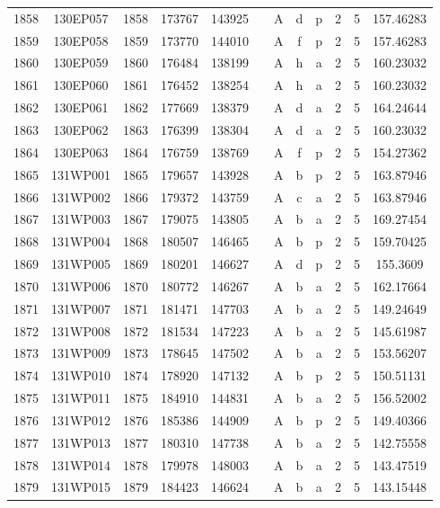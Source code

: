 \begin{tabular}{|*{12}{c|}}
1858 & 130EP057 & 1858 & 173767 & 143925 &  & A & d & p & 2 & 5 & 157.46283 \\ 
1859 & 130EP058 & 1859 & 173770 & 144010 &  & A & f & p & 2 & 5 & 157.46283 \\ 
1860 & 130EP059 & 1860 & 176484 & 138199 &  & A & h & a & 2 & 5 & 160.23032 \\ 
1861 & 130EP060 & 1861 & 176452 & 138254 &  & A & h & a & 2 & 5 & 160.23032 \\ 
1862 & 130EP061 & 1862 & 177669 & 138379 &  & A & d & a & 2 & 5 & 164.24644 \\ 
1863 & 130EP062 & 1863 & 176399 & 138304 &  & A & d & a & 2 & 5 & 160.23032 \\ 
1864 & 130EP063 & 1864 & 176759 & 138769 &  & A & f & p & 2 & 5 & 154.27362 \\ 
1865 & 131WP001 & 1865 & 179657 & 143928 &  & A & b & p & 2 & 5 & 163.87946 \\ 
1866 & 131WP002 & 1866 & 179372 & 143759 &  & A & c & a & 2 & 5 & 163.87946 \\ 
1867 & 131WP003 & 1867 & 179075 & 143805 &  & A & b & a & 2 & 5 & 169.27454 \\ 
1868 & 131WP004 & 1868 & 180507 & 146465 &  & A & b & p & 2 & 5 & 159.70425 \\ 
1869 & 131WP005 & 1869 & 180201 & 146627 &  & A & d & p & 2 & 5 & 155.3609 \\ 
1870 & 131WP006 & 1870 & 180772 & 146267 &  & A & b & a & 2 & 5 & 162.17664 \\ 
1871 & 131WP007 & 1871 & 181471 & 147703 &  & A & b & a & 2 & 5 & 149.24649 \\ 
1872 & 131WP008 & 1872 & 181534 & 147223 &  & A & b & a & 2 & 5 & 145.61987 \\ 
1873 & 131WP009 & 1873 & 178645 & 147502 &  & A & b & a & 2 & 5 & 153.56207 \\ 
1874 & 131WP010 & 1874 & 178920 & 147132 &  & A & b & p & 2 & 5 & 150.51131 \\ 
1875 & 131WP011 & 1875 & 184910 & 144831 &  & A & b & a & 2 & 5 & 156.52002 \\ 
1876 & 131WP012 & 1876 & 185386 & 144909 &  & A & b & p & 2 & 5 & 149.40366 \\ 
1877 & 131WP013 & 1877 & 180310 & 147738 &  & A & b & a & 2 & 5 & 142.75558 \\ 
1878 & 131WP014 & 1878 & 179978 & 148003 &  & A & b & a & 2 & 5 & 143.47519 \\ 
1879 & 131WP015 & 1879 & 184423 & 146624 &  & A & b & a & 2 & 5 & 143.15448 \\ 

\end{tabular}
